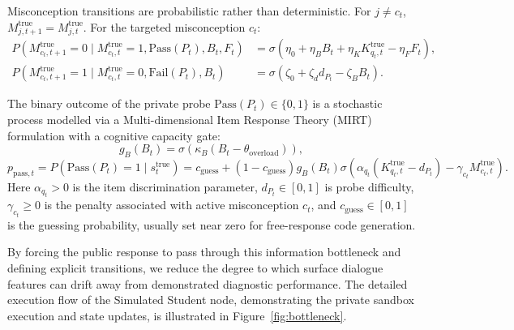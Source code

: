 \documentclass[11pt,a4paper]{report}
\begin{document}
Misconception transitions are probabilistic rather than deterministic. For $j\neq c_t$, $M^{\text{true}}_{j,t+1}=M^{\text{true}}_{j,t}$. For the targeted misconception $c_t$:
\begin{align}
    P(M^{\text{true}}_{c_t,t+1}=0 \mid M^{\text{true}}_{c_t,t}=1,\text{Pass}(P_t),B_t,F_t)
    &=
    \sigma(\eta_0+\eta_BB_t+\eta_KK^{\text{true}}_{q_t,t}-\eta_FF_t),\\
    P(M^{\text{true}}_{c_t,t+1}=1 \mid M^{\text{true}}_{c_t,t}=0,\text{Fail}(P_t),B_t)
    &=
    \sigma(\zeta_0+\zeta_d d_{P_t}-\zeta_BB_t).
\end{align}

The binary outcome of the private probe $\text{Pass}(P_t) \in \{0, 1\}$ is a stochastic process modelled via a Multi-dimensional Item Response Theory (MIRT) formulation with a cognitive capacity gate:
\begin{equation}
    g_B(B_t)=\sigma(\kappa_B(B_t-\theta_{\text{overload}})),
\end{equation}
\begin{equation}
    p_{\text{pass},t}
    =
    P(\text{Pass}(P_t)=1 \mid s_t^{\text{true}})
    =
    c_{\text{guess}}
    +
    (1-c_{\text{guess}})g_B(B_t)
    \sigma\left(
        \alpha_{q_t}(K^{\text{true}}_{q_t,t}-d_{P_t})
        -\gamma_{c_t}M^{\text{true}}_{c_t,t}
    \right).
\end{equation}
Here $\alpha_{q_t}>0$ is the item discrimination parameter, $d_{P_t}\in[0,1]$ is probe difficulty, $\gamma_{c_t}\ge0$ is the penalty associated with active misconception $c_t$, and $c_{\text{guess}}\in[0,1]$ is the guessing probability, usually set near zero for free-response code generation.

By forcing the public response to pass through this information bottleneck and defining explicit transitions, we reduce the degree to which surface dialogue features can drift away from demonstrated diagnostic performance. The detailed execution flow of the Simulated Student node, demonstrating the private sandbox execution and state updates, is illustrated in Figure~\ref{fig:bottleneck}.
\end{document}
